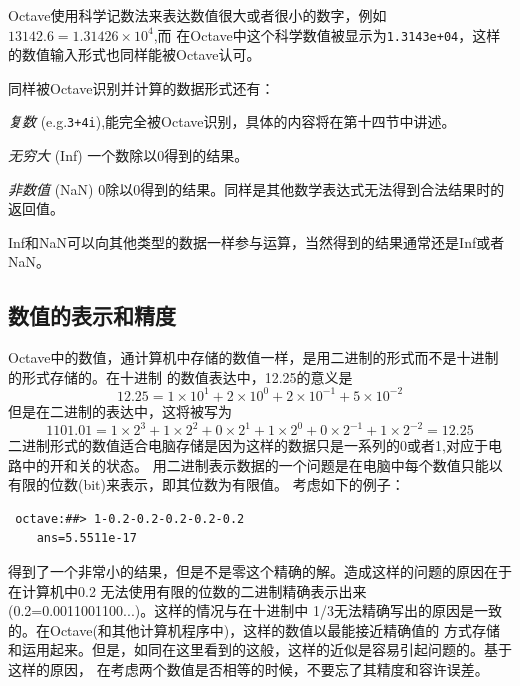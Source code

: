\documentclass[UTF8,adobefonts]{ctexart}
\begin{document}
Octave使用科学记数法来表达数值很大或者很小的数字，例如 $13142.6=1.31426\times10^4$,而
在Octave中这个科学数值被显示为{\tt 1.3143e+04}，这样的数值输入形式也同样能被Octave认可。

同样被Octave识别并计算的数据形式还有：
\begin{description}
 \item {\emph{复数}} (e.g.{\tt 3+4i}),能完全被Octave识别，具体的内容将在第十四节中讲述。
 \item {\emph{无穷大}} (Inf) 一个数除以0得到的结果。
 \item {\emph{非数值}} (NaN) 0除以0得到的结果。同样是其他数学表达式无法得到合法结果时的返回值。
\end{description}
Inf和NaN可以向其他类型的数据一样参与运算，当然得到的结果通常还是Inf或者NaN。
\subsection{数值的表示和精度}
Octave中的数值，通计算机中存储的数值一样，是用二进制的形式而不是十进制的形式存储的。在十进制
的数值表达中，12.25的意义是
\begin{equation}
 12.25=1\times10^1+2\times10^0+2\times10^{-1}+5\times10^{-2}
\end{equation}
但是在二进制的表达中，这将被写为
\begin{equation}
 1101.01=1\times2^3+1\times2^2+0\times2^1+1\times2^0+0\times2^{-1}+
1\times2^{-2}=12.25
\end{equation}
二进制形式的数值适合电脑存储是因为这样的数据只是一系列的0或者1,对应于电路中的开和关的状态。
用二进制表示数据的一个问题是在电脑中每个数值只能以有限的位数(bit)来表示，即其位数为有限值。
考虑如下的例子：
\begin{verbatim}
 octave:##> 1-0.2-0.2-0.2-0.2-0.2
    ans=5.5511e-17
\end{verbatim}
得到了一个非常小的结果，但是不是零这个精确的解。造成这样的问题的原因在于在计算机中0.2
无法使用有限的位数的二进制精确表示出来(0.2=0.0011001100...)。这样的情况与在十进制中
1/3无法精确写出的原因是一致的。在Octave(和其他计算机程序中)，这样的数值以最能接近精确值的
方式存储和运用起来。但是，如同在这里看到的这般，这样的近似是容易引起问题的。基于这样的原因，
在考虑两个数值是否相等的时候，不要忘了其精度和容许误差。
\end{document}
